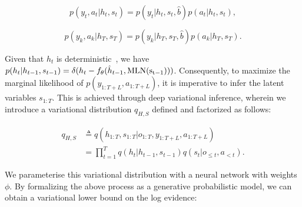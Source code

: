 \begin{footnotesize} 
	\begin{equation} \label{v22}
	p(y_t,a_t|h_{t},s_{t})=p(y_t|h_{t},s_{t},\hat{b})p(a_t|h_t,s_{t}),
	\end{equation}
\end{footnotesize} 

\begin{footnotesize} 
	\begin{equation} \label{v23}
	p(y_k,a_k|h_{T},s_{T})=p(y_k|h_{T},s_{T},\hat{b})p(a_{k}|h_T,s_{T}).
	\end{equation}
\end{footnotesize} 

Given that $h_t$ is deterministic~\cite{plas_wm,dreamerv2,mile}, we have $p(h_t|h_{t-1},s_{t-1})=\delta(h_t-f_\theta(\hat{h}_{t-1},\rm MLN(s_{t-1})))$. Consequently, to maximize the marginal likelihood of $p(y_{1:{T+L}},a_{1:{T+L}})$, it is imperative to infer the latent variables $s_{1:T}$. This is achieved through deep variational inference, wherein we introduce a variational distribution $q_{H,S}$ defined and factorized as follows:

\begin{footnotesize} 
	\begin{equation} \label{v3}
	\begin{aligned}
	q_{H,S}&\triangleq q(h_{1:T},s_{1:T}|o_{1:T},y_{1:T+L},a_{1:T+L})\\
	&=\displaystyle\prod_{t=1}^{T}q(h_t|h_{t-1},s_{t-1})q(s_t|o_{\le t},a_{< t}).
	\end{aligned}
	\end{equation} 
\end{footnotesize}

We parameterise this variational distribution with a neural network with weights $\phi $. By formalizing the above process as a generative probabilistic model, we can obtain a variational lower bound on the log evidence:

